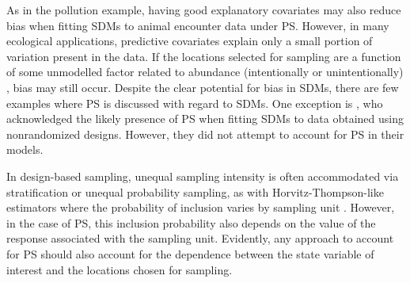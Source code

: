 \documentclass[times,mee,doublespace,]{besauth2}
\begin{document}
As in the pollution example, having good explanatory covariates may also reduce bias when fitting SDMs to animal encounter data under PS.  However, in many ecological applications, predictive covariates explain only a small portion of variation present in the data.  If the locations selected for sampling are a function of some unmodelled factor related to abundance (intentionally or unintentionally) , bias may still occur.  Despite the clear potential for bias in SDMs, there are few examples where PS \citep[\textit{sensu}][]{DiggleEtAl2010} is discussed with regard to SDMs.  One exception is
\citet{ChakrabortyEtAl2010}, who acknowledged the likely presence of PS when fitting SDMs to data obtained using nonrandomized designs.  However, they did not attempt to account for PS in their models.

In design-based sampling, unequal sampling intensity is often accommodated via stratification or unequal probability sampling, as with Horvitz-Thompson-like estimators where the probability of inclusion varies by sampling unit \citep{Cochran1977}.  However, in the case of PS, this inclusion probability also depends on the value of the response associated with the sampling unit.  Evidently, any approach to account for PS should also account for the dependence between the state variable of interest and the locations chosen for sampling.
\end{document}
